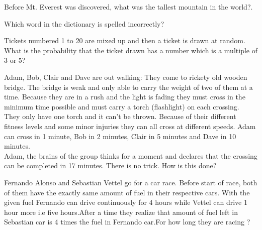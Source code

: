 \documentclass[12pt]{exam}
\begin{document}
\begin{questions}



\question[2] Before Mt. Everest was discovered, what was the tallest mountain in the world?.
\vspace{5mm}
\\
\makebox[7in]{\hrulefill}
\addpoints

\question[2] Which word in the dictionary is spelled incorrectly?
\vspace{5mm}
\\
\makebox[7in]{\hrulefill}
\addpoints

\question[2] Tickets numbered 1 to 20 are mixed up and then a ticket is drawn at random. What is the probability that the ticket drawn has a number which is a multiple of 3 or 5? \hfill \fbox{
	\begin{minipage}{1cm}
		\hfill\vspace{3mm}
	\end{minipage}
	}
\addpoints

\question[4]Adam, Bob, Clair and Dave are out walking: They come to rickety old wooden bridge. The bridge is weak and only able to carry the weight of two of them at a time. Because they are in a rush and the light is fading they must cross in the minimum time possible and must carry a torch (flashlight) on each crossing.\\

They only have one torch and it can't be thrown. Because of their different fitness levels and some minor injuries they can all cross at different speeds. Adam can cross in 1 minute, Bob in 2 minutes, Clair in 5 minutes and Dave in 10 minutes.\\

Adam, the brains of the group thinks for a moment and declares that the crossing can be completed in 17 minutes. There is no trick. How is this done?
\fillwithlines{8em}
\addpoints

\question[3]
Fernando Alonso and Sebastian Vettel go for a car race. Before start of race, both of them have the exactly same amount of fuel in their respective cars. With the given fuel Fernando can drive continuously for 4 hours while Vettel can drive 1 hour more i.e five hours.After a time they realize that amount of fuel left in Sebastian car is 4 times the fuel in Fernando car.For how long they are racing ?
\hfill \fbox{
	\begin{minipage}{1cm}
		\hfill\vspace{3mm}
	\end{minipage}
	}
\addpoints


\end{questions}
\end{document}
